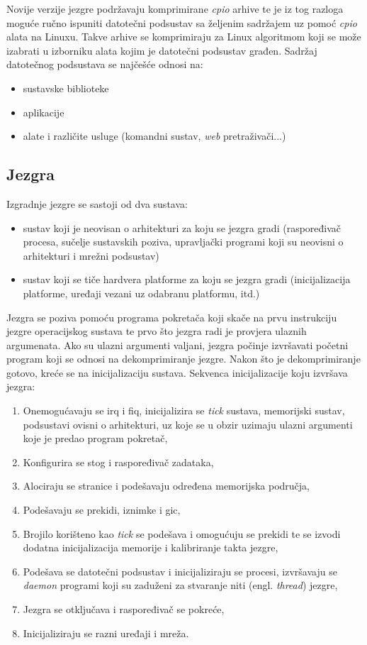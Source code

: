 \documentclass[times, utf8, diplomski, numeric]{fer}
\begin{document}
Novije verzije jezgre podržavaju komprimirane \textit{cpio} arhive te je iz tog razloga moguće ručno ispuniti datotečni
podsustav sa željenim sadržajem uz pomoć \textit{cpio} alata na Linuxu. Takve arhive se komprimiraju za Linux algoritmom
koji se može izabrati u izborniku alata kojim je datotečni podsustav građen.
Sadržaj datotečnog podsustava se najčešće odnosi na:
\begin{itemize}
  \item{sustavske biblioteke}
  \item{aplikacije}
  \item{alate i različite usluge (komandni sustav, \textit{web} pretraživači...)}
\end{itemize}

\newpage
\subsection{Jezgra}
Izgradnje jezgre se sastoji od dva sustava:
\begin{itemize}
  \item{sustav koji je neovisan o arhitekturi za koju se jezgra gradi (raspoređivač procesa, sučelje sustavskih poziva,
  upravljački programi koji su neovisni o arhitekturi i mrežni podsustav)}
  \item{sustav koji se tiče hardvera platforme za koju se jezgra gradi (inicijalizacija platforme, uređaji vezani uz odabranu
  platformu, itd.)}
\end{itemize}
Jezgra se poziva pomoću programa pokretača koji skače na prvu instrukciju jezgre operacijskog sustava te prvo što jezgra radi je
provjera ulaznih argumenata. Ako su ulazni argumenti valjani, jezgra počinje izvršavati početni program koji se odnosi na
dekomprimiranje jezgre. Nakon što je dekomprimiranje gotovo, kreće se na inicijalizaciju sustava. Sekvenca inicijalizacije
koju izvršava jezgra:
\begin{enumerate}
  \item{Onemogućavaju se \gls{irq} i \gls{fiq}, inicijalizira se \textit{tick} sustava, memorijski sustav, podsustavi ovisni o arhitekturi,
  uz koje se u obzir uzimaju ulazni argumenti koje je predao program pokretač,}
  \item{Konfigurira se stog i raspoređivač zadataka,}
  \item{Alociraju se stranice i podešavaju određena memorijska područja,}
  \item{Podešavaju se prekidi, iznimke i \gls{gic},}
  \item{Brojilo korišteno kao \textit{tick} se podešava i omogućuju se prekidi te se izvodi dodatna inicijalizacija memorije i
  kalibriranje takta jezgre,}
  \item{Podešava se datotečni podsustav i inicijaliziraju se procesi, izvršavaju se \textit{daemon} programi koji su zaduženi
  za stvaranje niti (engl. \textit{thread}) jezgre,}
  \item{Jezgra se otključava i raspoređivač se pokreće,}
  \item{Inicijaliziraju se razni uređaji i mreža.}
\end{enumerate}
\end{document}
